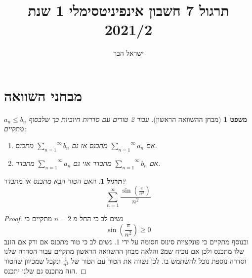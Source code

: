 \documentclass{article}
\begin{document}
\title{תרגול 7 חשבון אינפיניטסימלי 1 שנת 2021/2}
\author{ישראל הבר}
\maketitle

\newtheorem{theorem}{משפט}
\newtheorem{exercise}{תרגיל}
\newtheorem{homeexercise}{תרגיל לבית}
\newtheorem{example}{דוגמה}
\theoremstyle{definition}
\newtheorem{definition}{הגדרה}
\newtheorem{notation}{סימון}
\newtheorem{claim}{טענה}
\newtheorem{comment}{\emph{הערה}}
\renewcommand\qedsymbol{$\blacksquare$}
\newcommand{\limtoinfty}{\underset{n\rightarrow\infty}{\lim}}
\newcommand{\limtur}{\overset{\infty}{\underset{n=1}{\sum}}}
\newcommand{\limturstart}[1]{\overset{\infty}{\underset{n=#1}{\sum}}}
\newcommand{\limsuptoinfty}{\underset{n\rightarrow\infty}{\limsup}}
\newcommand{\liminftoinfty}{\underset{n\rightarrow\infty}{\liminf}}
\newcommand{\limtoinftym}{\underset{m\rightarrow\infty}{\lim}}
\newcommand{\limtop}{\underset{-}{\lim}}
\newcommand{\limbottom}{\overset{-}{\lim}}
\newcommand{\goesto}{\underset{n\rightarrow\infty}{\longrightarrow}}
\newcommand{\goestom}{\underset{m\rightarrow\infty}{\longrightarrow}}
\newcommand{\goesfrom}{\underset{n\rightarrow\infty}{\longleftarrow}}
\newcommand{\series}[2]{\{#1\}_{#2\in\mathbb{N}}}

\section*{מבחני השוואה}
\begin{theorem}[מבחן ההשוואה הראשון]
עבור 2 טורים עם סדרות חיוביות כך שלבסוף 
$a_n\leq b_n$
מתקיים:
\begin{enumerate}
\item אם 
$\limtur a_n$
מתכנס אז גם 
$\limtur b_n$
מתכנס.
\item אם 
$\limtur b_n$
מתבדר אזי גם 
$\limtur a_n$
מתבדר.
\end{enumerate}
\end{theorem}

\begin{exercise}
האם הטור הבא מתכנס או מתבדר?
\[\limtur \frac{\sin\left(\frac{\pi}{n^2}\right)}{n^2}\]
\end{exercise}

\begin{proof}
נשים לב כי החל מ
$n=2$
מתקיים כי 
\[\sin\left(\frac{\pi}{n^2}\right)\geq 0 \]
ובנוסף מתקיים כי פונקציית סינוס חסומה על ידי 1. נשים לב כי טור מתכנס אם ורק אם הזנב שלו מתכנס ולכן אם נוכיח שמ2 והלאה מבחן ההשוואה הראשון מתקיים עבור הסדרה שלנו וסדרה נוספת נוכל להשתמש בו. לכן נשווה את הטור עם הטור של 
$\frac{1}{n^2}$
ונקבל שמכיוון שהטור הזה מתכנס גם שלנו יתכנס.
\end{proof}
\end{document}
